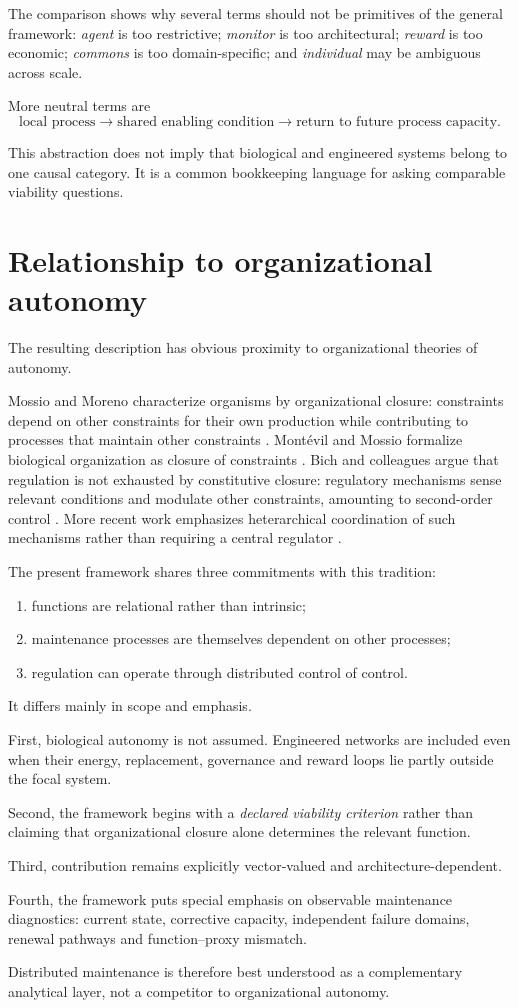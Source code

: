 The comparison shows why several terms should not be primitives of the general framework: \emph{agent} is too restrictive; \emph{monitor} is too architectural; \emph{reward} is too economic; \emph{commons} is too domain-specific; and \emph{individual} may be ambiguous across scale.

More neutral terms are
\[
\boxed{
\text{local process}
\rightarrow
\text{shared enabling condition}
\rightarrow
\text{return to future process capacity}.
}
\]

This abstraction does not imply that biological and engineered systems belong to one causal category. It is a common bookkeeping language for asking comparable viability questions.

\section{Relationship to organizational autonomy}

The resulting description has obvious proximity to organizational theories of autonomy.

Mossio and Moreno characterize organisms by organizational closure: constraints depend on other constraints for their own production while contributing to processes that maintain other constraints \citep{mossio2010}. Montévil and Mossio formalize biological organization as closure of constraints \citep{montevil2015}. Bich and colleagues argue that regulation is not exhausted by constitutive closure: regulatory mechanisms sense relevant conditions and modulate other constraints, amounting to second-order control \citep{bich2016}. More recent work emphasizes heterarchical coordination of such mechanisms rather than requiring a central regulator \citep{bich2022}.

The present framework shares three commitments with this tradition:
\begin{enumerate}[label=(\arabic*)]
\item functions are relational rather than intrinsic;
\item maintenance processes are themselves dependent on other processes;
\item regulation can operate through distributed control of control.
\end{enumerate}

It differs mainly in scope and emphasis.

First, biological autonomy is not assumed. Engineered networks are included even when their energy, replacement, governance and reward loops lie partly outside the focal system.

Second, the framework begins with a \emph{declared viability criterion} rather than claiming that organizational closure alone determines the relevant function.

Third, contribution remains explicitly vector-valued and architecture-dependent.

Fourth, the framework puts special emphasis on observable maintenance diagnostics: current state, corrective capacity, independent failure domains, renewal pathways and function--proxy mismatch.

Distributed maintenance is therefore best understood as a complementary analytical layer, not a competitor to organizational autonomy.
